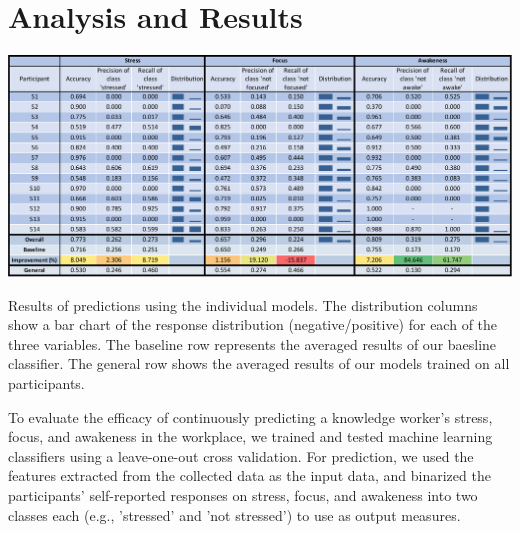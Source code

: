 %

\section{Analysis and Results}

\begin{table}[h]
  \centering
  \includegraphics[width=1.0\textwidth]{rq1performance.pdf}
  \caption{Results of predictions using the individual models. The distribution columns show a bar chart of the response distribution (negative/positive) for each of the three variables. The baseline row represents the averaged results of our baesline classifier. The general row shows the averaged results of our models trained on all participants.}\label{tab:accuracy}%
  \vspace*{-4mm}
\end{table}

To evaluate the efficacy of continuously predicting a knowledge worker's stress, focus, and awakeness in the workplace, we trained and tested machine learning classifiers using a leave-one-out cross validation. For prediction, we used the features extracted from the collected data as the input data, and binarized the participants' self-reported responses on stress, focus, and awakeness into two classes each (e.g., 'stressed' and 'not stressed') to use as output measures.

